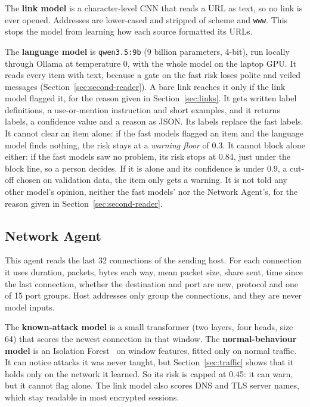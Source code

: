 The \textbf{link model} is a character-level CNN that reads a URL as text, so no link is ever opened. Addresses are lower-cased and stripped of scheme and \texttt{www}. This stops the model from learning how each source formatted its URLs.

The \textbf{language model} is \texttt{qwen3.5:9b} (9 billion parameters, 4-bit), run locally through Ollama at temperature 0, with the whole model on the laptop GPU. It reads every item with text, because a gate on the fast risk loses polite and veiled messages (Section~\ref{sec:second-reader}). A bare link reaches it only if the link model flagged it, for the reason given in Section~\ref{sec:links}. It gets written label definitions, a use-or-mention instruction and short examples, and it returns labels, a confidence value and a reason as JSON. Its labels replace the fast labels. It cannot clear an item alone: if the fast models flagged an item and the language model finds nothing, the risk stays at a \emph{warning floor} of 0.3. It cannot block alone either: if the fast models saw no problem, its risk stops at 0.84, just under the block line, so a person decides. If it is alone and its confidence is under 0.9, a cut-off chosen on validation data, the item only gets a warning. It is not told any other model's opinion, neither the fast models' nor the Network Agent's, for the reason given in Section~\ref{sec:second-reader}.

\subsection{Network Agent}

This agent reads the last 32 connections of the sending host. For each connection it uses duration, packets, bytes each way, mean packet size, share sent, time since the last connection, whether the destination and port are new, protocol and one of 15 port groups. Host addresses only group the connections, and they are never model inputs.

The \textbf{known-attack model} is a small transformer (two layers, four heads, size 64) that scores the newest connection in that window. The \textbf{normal-behaviour model} is an Isolation Forest~\cite{iforest} on window features, fitted only on normal traffic. It can notice attacks it was never taught, but Section~\ref{sec:traffic} shows that it holds only on the network it learned. So its risk is capped at 0.45: it can warn, but it cannot flag alone. The link model also scores DNS and TLS server names, which stay readable in most encrypted sessions.

